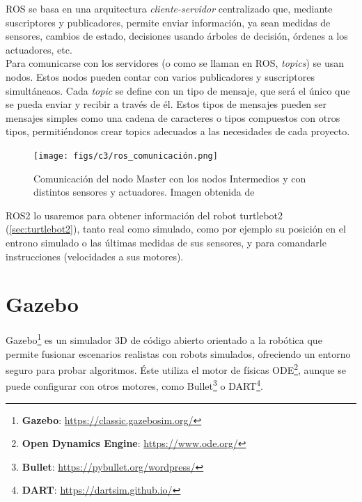 ROS se basa en una arquitectura \textit{cliente-servidor} centralizado que, mediante suscriptores y publicadores, permite enviar información,
ya sean medidas de sensores, cambios de estado, decisiones usando árboles de decisión, órdenes a los actuadores, etc.\\

Para comunicarse con los servidores (o como se llaman en ROS, \textit{topics}) se usan nodos. Estos nodos pueden contar con varios publicadores y suscriptores
simultáneaos.
Cada \textit{topic} se define con un tipo de mensaje, que será el único que se pueda enviar y recibir a través de él. Estos tipos de mensajes pueden ser
mensajes simples como una cadena de caracteres o tipos compuestos con otros tipos, permitiéndonos crear topics adecuados a las necesidades de cada proyecto.\\

\begin{figure} [H]
    \begin{center}
        \texttt{[image: figs/c3/ros\_comunicación.png]}
    \end{center}
    \caption[Comunicación entre nodos ROS.]{Comunicación del nodo Master con los nodos Intermedios y con distintos sensores y actuadores. Imagen obtenida de \cite{comunicacion_ros2}}
    \label{fig:ros_master_comunicacion}
\end{figure}

ROS2 lo usaremos para obtener información del robot turtlebot2 (\ref{sec:turtlebot2}), tanto real como simulado, como por ejemplo su posición
en el entrono simulado o las últimas medidas de sus sensores, y para comandarle instrucciones (velocidades a sus motores).

\section{Gazebo}
\label{sec:gazebo}

Gazebo\footnote{\textbf{Gazebo}: \url{https://classic.gazebosim.org/}} es un simulador 3D de código abierto orientado a la robótica que permite
fusionar escenarios realistas con robots simulados, ofreciendo un entorno seguro para probar algoritmos. Éste utiliza el motor de físicas
ODE\footnote{\textbf{Open Dynamics Engine}: \url{https://www.ode.org/}}, aunque se puede configurar con otros motores, como
Bullet\footnote{\textbf{Bullet}: \url{https://pybullet.org/wordpress/}} o DART\footnote{\textbf{DART}: \url{https://dartsim.github.io/}}.\\

